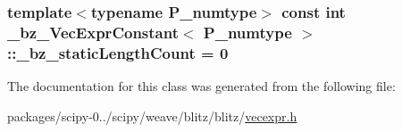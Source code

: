\subsubsection[{\+\_\+bz\+\_\+static\+Length\+Count}]{\setlength{\rightskip}{0pt plus 5cm}template$<$typename P\+\_\+numtype$>$ const int {\bf \+\_\+bz\+\_\+\+Vec\+Expr\+Constant}$<$ P\+\_\+numtype $>$\+::\+\_\+bz\+\_\+static\+Length\+Count = 0\hspace{0.3cm}{\ttfamily [static]}}\label{class__bz__VecExprConstant_afae3a23d1d03c41df52bdf1d45278b93}


The documentation for this class was generated from the following file\+:\begin{DoxyCompactItemize}
\item 
packages/scipy-\/0../scipy/weave/blitz/blitz/\hyperlink{vecexpr_8h}{vecexpr.\+h}\end{DoxyCompactItemize}
